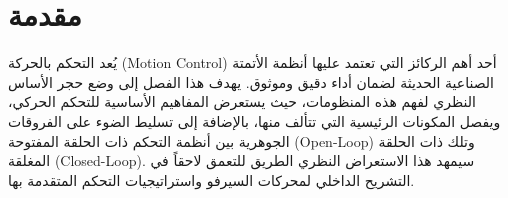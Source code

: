 \chapter{مقدمة}
\label{ch:introduction}

يُعد التحكم بالحركة (\textenglish{Motion Control}) أحد أهم الركائز التي تعتمد عليها أنظمة الأتمتة الصناعية الحديثة لضمان أداء دقيق وموثوق. يهدف هذا الفصل إلى وضع حجر الأساس النظري لفهم هذه المنظومات، حيث يستعرض المفاهيم الأساسية للتحكم الحركي، ويفصل المكونات الرئيسية التي تتألف منها، بالإضافة إلى تسليط الضوء على الفروقات الجوهرية بين أنظمة التحكم ذات الحلقة المفتوحة (\textenglish{Open-Loop}) وتلك ذات الحلقة المغلقة (\textenglish{Closed-Loop}). سيمهد هذا الاستعراض النظري الطريق للتعمق لاحقاً في التشريح الداخلي لمحركات السيرفو واستراتيجيات التحكم المتقدمة بها.

\vspace{0.5cm} %

